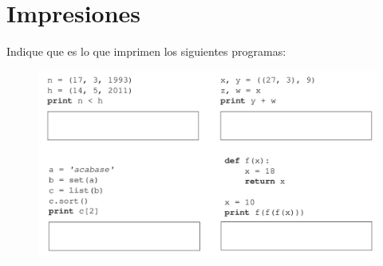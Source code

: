 \section{Impresiones}

Indique que es lo que imprimen los siguientes programas:

\begin{figure}[h]
	\includegraphics[scale=0.75]{Imagenes/impresiones.png}
\end{figure}

